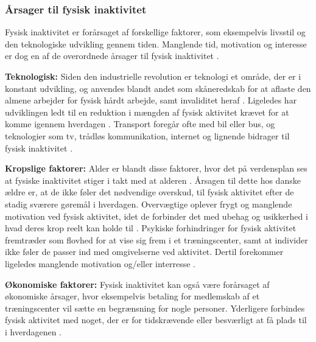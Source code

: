 \subsubsection{Årsager til fysisk inaktivitet}
Fysisk inaktivitet er forårsaget af forskellige faktorer, som eksempelvis livsstil og den teknologiske udvikling gennem tiden. Manglende tid, motivation og interesse er dog en af de overordnede årsager til fysisk inaktivitet \citep{ottesen2005}.  

\textbf{Teknologisk:}  
Siden den industrielle revolution er teknologi et område, der er i konstant udvikling, og anvendes blandt andet som skåneredskab for at aflaste den almene arbejder for fysisk hårdt arbejde, samt invaliditet heraf \citep{hallal2012}. 
Ligeledes har udviklingen ledt til en reduktion i mængden af fysisk aktivitet krævet for at komme igennem hverdagen \citep{hallal2012, motionsraad2007}. Transport foregår ofte med bil eller bus, og teknologier som tv, trådløs kommunikation, internet og lignende bidrager til fysisk inaktivitet \citep{hallal2012}.  

\textbf{Kropslige faktorer:}
Alder er blandt disse faktorer, hvor det på verdensplan ses at fysiske inaktivitet stiger i takt med at alderen \citep{guthold2008}. 
Årsagen til dette hos danske ældre er, at de ikke føler det nødvendige overskud, til fysisk aktivitet efter de stadig sværere gøremål i hverdagen. 
Overvægtige oplever frygt og manglende motivation ved fysisk aktivitet, idet de forbinder det med ubehag og usikkerhed i hvad deres krop reelt kan holde til \citep{ottesen2005}. 
Psykiske forhindringer for fysisk aktivitet fremtræder som flovhed for at vise sig frem i et træningscenter, samt at individer ikke føler de passer ind med omgivelserne ved aktivitet. 
Dertil forekommer ligeledes manglende motivation og/eller interresse \citep{ottesen2005}.

\textbf{Økonomiske faktorer:}
Fysisk inaktivitet kan også være forårsaget af økonomiske årsager, hvor eksempelvis betaling for medlemskab af et træningscenter vil sætte en begrænsning for nogle personer. Yderligere forbindes fysisk aktivitet med noget, der er for tidskrævende eller besværligt at få plads til i hverdagenen \citep{ottesen2005}.
